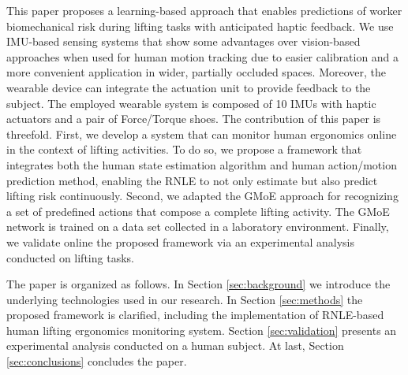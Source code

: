 This paper proposes a learning-based approach that enables predictions of worker biomechanical risk during lifting tasks with anticipated haptic feedback. We use IMU-based sensing systems that show some advantages over vision-based approaches when used for human motion tracking due to easier calibration and a more convenient application in wider, partially occluded spaces. Moreover, the wearable device can integrate the actuation unit to provide feedback to the subject.
The employed wearable system is composed of 10 IMUs with haptic actuators and a pair of Force/Torque shoes.
The contribution of this paper is threefold. First, we develop a system that can monitor human ergonomics online in the context of lifting activities. To do so, we propose a framework that integrates both the human state estimation algorithm and human action/motion prediction method, enabling the RNLE to not only estimate but also predict lifting risk continuously. Second, we adapted the GMoE \cite{Kourosh2022} approach for recognizing a set of predefined actions that compose a complete lifting activity. The GMoE network is trained on a data set collected in a laboratory environment. Finally, we validate online the proposed framework via an experimental analysis conducted on lifting tasks.

The paper is organized as follows. In Section \ref{sec:background} we introduce the underlying technologies used in our research. In Section \ref{sec:methods} the proposed framework is clarified, including the implementation of RNLE-based human lifting ergonomics monitoring system. Section \ref{sec:validation} presents an experimental analysis conducted on a human subject. At last, Section \ref{sec:conclusions} concludes the paper.